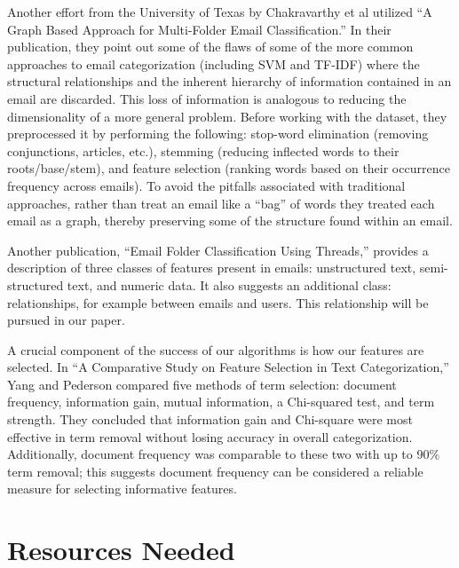 \documentclass[11pt]{article}
\begin{document}
Another effort from the University of Texas by Chakravarthy et al utilized “A Graph Based Approach for Multi-Folder Email Classification.”  In their publication, they point out some of the flaws of some of the more common approaches to email categorization (including SVM and TF-IDF) where the structural relationships and the inherent hierarchy of information contained in an email are discarded.  This loss of information is analogous to reducing the dimensionality of a more general problem.  
Before working with the dataset, they preprocessed it by performing the following: stop-word elimination (removing conjunctions, articles, etc.), stemming (reducing inflected words to their roots/base/stem), and feature selection (ranking words based on their occurrence frequency across emails).
To avoid the pitfalls associated with traditional approaches, rather than treat an email like a “bag” of words they treated each email as a graph, thereby preserving some of the structure found within an email.

Another publication, “Email Folder Classification Using Threads,” provides a description of three classes of features present in emails: unstructured text, semi-structured text, and numeric data. It also suggests an additional class: relationships, for example between emails and users. This relationship will be pursued in our paper.

A crucial component of the success of our algorithms is how our features are selected.  In “A Comparative Study on Feature Selection in Text Categorization,” Yang and Pederson compared five methods of term selection: document frequency, information gain, mutual information, a Chi-squared test, and term strength.  They concluded that information gain and Chi-square were most effective in term removal without losing accuracy in overall categorization.  Additionally, document frequency was comparable to these two with up to 90\% term removal; this suggests document frequency can be considered a reliable measure for selecting informative features.
\section{Resources Needed}
\label{sec-3}
\end{document}
